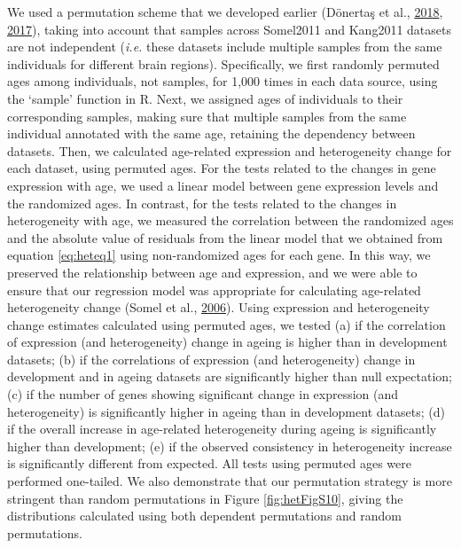 \documentclass[12pt,twoside]{unicam}
\begin{document}
We used a permutation scheme that we developed earlier (Dönertaş et al., \protect\hyperlink{ref-Donertas2018}{2018}, \protect\hyperlink{ref-Donertas2017}{2017}), taking into account that samples across Somel2011 and Kang2011 datasets are not independent (\emph{i.e.} these datasets include multiple samples from the same individuals for different brain regions). Specifically, we first randomly permuted ages among individuals, not samples, for 1,000 times in each data source, using the `sample' function in R. Next, we assigned ages of individuals to their corresponding samples, making sure that multiple samples from the same individual annotated with the same age, retaining the dependency between datasets. Then, we calculated age-related expression and heterogeneity change for each dataset, using permuted ages. For the tests related to the changes in gene expression with age, we used a linear model between gene expression levels and the randomized ages. In contrast, for the tests related to the changes in heterogeneity with age, we measured the correlation between the randomized ages and the absolute value of residuals from the linear model that we obtained from equation \eqref{eq:heteq1} using non-randomized ages for each gene. In this way, we preserved the relationship between age and expression, and we were able to ensure that our regression model was appropriate for calculating age-related heterogeneity change (Somel et al., \protect\hyperlink{ref-Somel2006}{2006}). Using expression and heterogeneity change estimates calculated using permuted ages, we tested (a) if the correlation of expression (and heterogeneity) change in ageing is higher than in development datasets; (b) if the correlations of expression (and heterogeneity) change in development and in ageing datasets are significantly higher than null expectation; (c) if the number of genes showing significant change in expression (and heterogeneity) is significantly higher in ageing than in development datasets; (d) if the overall increase in age-related heterogeneity during ageing is significantly higher than development; (e) if the observed consistency in heterogeneity increase is significantly different from expected. All tests using permuted ages were performed one-tailed. We also demonstrate that our permutation strategy is more stringent than random permutations in Figure \ref{fig:hetFigS10}, giving the distributions calculated using both dependent permutations and random permutations.
\end{document}
